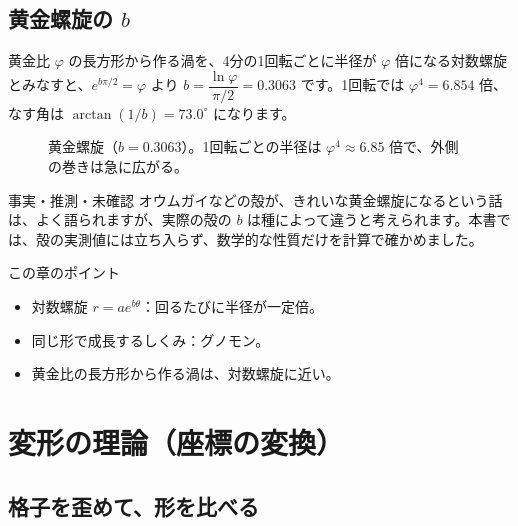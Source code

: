 \documentclass[a4paper,11pt,openany]{ltjsbook}
\begin{document}
\section{黄金螺旋の $b$}

黄金比 $\varphi$ の長方形から作る渦を、4分の1回転ごとに半径が $\varphi$ 倍になる対数螺旋とみなすと、$e^{b\pi/2}=\varphi$ より $b=\dfrac{\ln\varphi}{\pi/2}=0.3063$ です。1回転では $\varphi^4=6.854$ 倍、なす角は $\arctan(1/b)=73.0^\circ$ になります。

\begin{figure}[htbp]
\centering
{}
\caption{黄金螺旋（$b=0.3063$）。1回転ごとの半径は $\varphi^4\approx6.85$ 倍で、外側の巻きは急に広がる。}
\end{figure}

\begin{notebox}{事実・推測・未確認}
オウムガイなどの殻が、きれいな黄金螺旋になるという話は、よく語られますが、実際の殻の $b$ は種によって違うと考えられます。本書では、殻の実測値には立ち入らず、数学的な性質だけを計算で確かめました。
\end{notebox}

\begin{pointbox}{この章のポイント}
\begin{itemize}[leftmargin=1.5em]
\item 対数螺旋 $r=ae^{b\theta}$：回るたびに半径が一定倍。
\item 同じ形で成長するしくみ：グノモン。
\item 黄金比の長方形から作る渦は、対数螺旋に近い。
\end{itemize}
\end{pointbox}

\chapter{変形の理論（座標の変換）}

\section{格子を歪めて、形を比べる}
\end{document}
